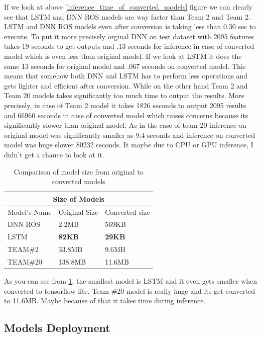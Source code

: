 If we look at above \ref{inference_time_of_converted_models} figure we can clearly see that LSTM and DNN ROS models are way faster than Team 2 and Team 2. LSTM and DNN ROS models even after conversion is taking less than 0.30 sec to execute. To put it more precisely orginal DNN on test dataset with 2095 features takes 19 seconds to get outputs and .13 seconds for inference in case of converted model which is even less than original model. If we look at LSTM it does the same 13 seconds for original model and .067 seconds on converted model. This means that somehow both DNN and LSTM has to perform less operations and gets lighter and efficient after conversion. While on the other hand Team 2 and Team 20 models takes significantly too much time to output the results. More precisely, in case of Team 2 model it takes 1826 seconds to output 2095 results and 66960 seconds in case of converted model which raises concerns because its significantly slower than original model. As in the case of team 20 inference on original model was significantly smaller as 9.4 seconds and inference on converted model was huge slower 80232 seconds. It maybe due to CPU or GPU inference, I didn't get a chance to look at it. 

\begin{table}
\centering
\begin{tabular}{ |p{5cm}||p{3cm}|p{3cm}|}
 \hline
 \multicolumn{3}{|c|}{Size of Models} \\
 \hline
 Model's Name& Original Size&Converted size\\
 \hline
 DNN ROS   & 2.2MB   &   569KB\\
 LSTM&  \textbf{82KB}   & \textbf{29KB} \\
 TEAM\#2 &33.8MB & 9.6MB\\
 TEAM\#20  & 138.8MB & 11.6MB\\
 \hline
\end{tabular}
 \caption{\label{tab:models_size_after_conversion}Comparison of model size from original to converted models}
 \end{table}
 
 As you can see from \ref{tab:models_size_after_conversion}, the smallest model is LSTM and it even gets smaller when converted to tensorflow lite. Team \#20 model is really huge and its get converted to 11.6MB. Maybe because of that it takes time during inference. 
 
\subsection{Models Deployment}\label{modelsdeployment}

